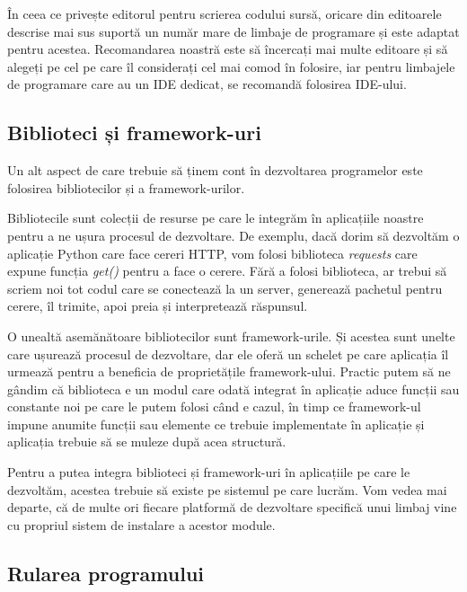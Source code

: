 În ceea ce privește editorul pentru scrierea codului sursă, oricare din editoarele descrise mai sus suportă un număr mare de limbaje de programare și este adaptat pentru acestea.
Recomandarea noastră este să încercați mai multe editoare și să alegeți pe cel pe care îl considerați cel mai comod în folosire, iar pentru limbajele de programare care au un IDE dedicat, se recomandă folosirea IDE-ului.

\subsection{Biblioteci și framework-uri}
\label{sec:appdev:dev:libs}

Un alt aspect de care trebuie să ținem cont în dezvoltarea programelor este folosirea bibliotecilor și a framework-urilor.

Bibliotecile sunt colecții de resurse pe care le integrăm în aplicațiile noastre pentru a ne ușura procesul de dezvoltare.
De exemplu, dacă dorim să dezvoltăm o aplicație Python care face cereri HTTP, vom folosi biblioteca \textit{requests} care expune funcția \textit{get()} pentru a face o cerere.
Fără a folosi biblioteca, ar trebui să scriem noi tot codul care se conectează la un server, generează pachetul pentru cerere, îl trimite, apoi preia și interpretează răspunsul.

O unealtă asemănătoare bibliotecilor sunt framework-urile.
Și acestea sunt unelte care ușurează procesul de dezvoltare, dar ele oferă un schelet pe care aplicația îl urmează pentru a beneficia de proprietățile framework-ului.
Practic putem să ne gândim că biblioteca e un modul care odată integrat în aplicație aduce funcții sau constante noi pe care le putem folosi când e cazul, în timp ce framework-ul impune anumite funcții sau elemente ce trebuie implementate în aplicație și aplicația trebuie să se muleze după acea structură.

Pentru a putea integra biblioteci și framework-uri în aplicațiile pe care le dezvoltăm, acestea trebuie să existe pe sistemul pe care lucrăm.
Vom vedea mai departe, că de multe ori fiecare platformă de dezvoltare specifică unui limbaj vine cu propriul sistem de instalare a acestor module.

\subsection{Rularea programului}
\label{sec:appdev:dev:run}

